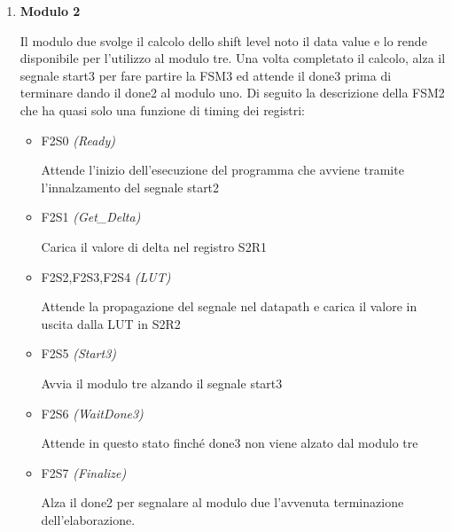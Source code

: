 \documentclass{article}
\begin{document}
\begin{enumerate}
    \item \textbf{Modulo 2}
		
		Il modulo due svolge il calcolo dello shift level noto il data value e lo rende disponibile per l'utilizzo al modulo tre. Una volta completato il calcolo, alza il segnale start3 per fare partire la FSM3 ed attende il done3 prima di terminare dando il done2 al modulo uno. Di seguito la descrizione della FSM2 che ha quasi solo una funzione di timing dei registri:
			\begin{itemize}
				\item F2S0 \emph{(Ready)}
				
				Attende l'inizio dell'esecuzione del programma che avviene tramite l'innalzamento del segnale start2
				
				\item F2S1 \emph{(Get\_Delta)}
				
				Carica il valore di delta nel registro S2R1
				
				\item F2S2,F2S3,F2S4 \emph{(LUT)}
				
				Attende la propagazione del segnale nel datapath e carica il valore in uscita dalla LUT in S2R2
				
				\item F2S5 \emph{(Start3)}
				
				Avvia il modulo tre alzando il segnale start3
				
				\item F2S6 \emph{(WaitDone3)}
				
				Attende in questo stato finché done3 non viene alzato dal modulo tre
				\item F2S7 \emph{(Finalize)}
				
				Alza il done2 per segnalare al modulo due l'avvenuta terminazione dell'elaborazione.
				
				
			\end{itemize}


\end{enumerate}
\end{document}
